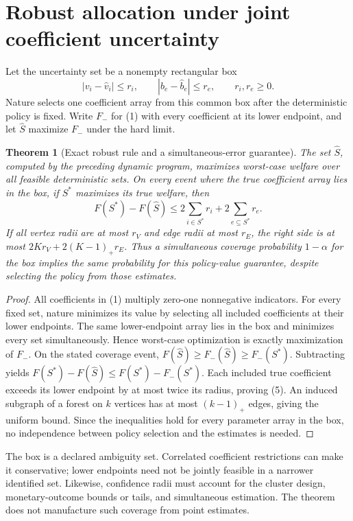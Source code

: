 \documentclass[11pt]{article}
\newtheorem{theorem}{Theorem}
\theoremstyle{remark}\newtheorem{remark}[theorem]{Remark}
\begin{document}
\section*{Robust allocation under joint coefficient uncertainty}
Let the uncertainty set be a nonempty rectangular box
\[
 |v_i-\widehat v_i|\le r_i,\qquad
 |b_e-\widehat b_e|\le r_e,\qquad r_i,r_e\ge0.
\]
Nature selects one coefficient array from this common box after the deterministic policy is fixed. Write $F_-$ for (1) with every coefficient at its lower endpoint, and let $\widehat S$ maximize $F_-$ under the hard limit.

\begin{theorem}[Exact robust rule and a simultaneous-error guarantee]
The set $\widehat S$, computed by the preceding dynamic program, maximizes worst-case welfare over all feasible deterministic sets. On every event where the true coefficient array lies in the box, if $S^*$ maximizes its true welfare, then
\[
 F(S^*)-F(\widehat S)
 \le 2\sum_{i\in S^*}r_i+
 2\sum_{e\subseteq S^*}r_e.
 \tag{5}
\]
If all vertex radii are at most $r_V$ and edge radii at most $r_E$, the right side is at most $2Kr_V+2(K-1)_+r_E$. Thus a simultaneous coverage probability $1-\alpha$ for the box implies the same probability for this policy-value guarantee, despite selecting the policy from those estimates.
\end{theorem}
\begin{proof}
All coefficients in (1) multiply zero-one nonnegative indicators. For every fixed set, nature minimizes its value by selecting all included coefficients at their lower endpoints. The same lower-endpoint array lies in the box and minimizes every set simultaneously. Hence worst-case optimization is exactly maximization of $F_-$. On the stated coverage event, $F(\widehat S)\ge F_-(\widehat S)\ge F_-(S^*)$. Subtracting yields $F(S^*)-F(\widehat S)\le F(S^*)-F_-(S^*)$. Each included true coefficient exceeds its lower endpoint by at most twice its radius, proving (5). An induced subgraph of a forest on $k$ vertices has at most $(k-1)_+$ edges, giving the uniform bound. Since the inequalities hold for every parameter array in the box, no independence between policy selection and the estimates is needed.
\end{proof}

The box is a declared ambiguity set. Correlated coefficient restrictions can make it conservative; lower endpoints need not be jointly feasible in a narrower identified set. Likewise, confidence radii must account for the cluster design, monetary-outcome bounds or tails, and simultaneous estimation. The theorem does not manufacture such coverage from point estimates.
\end{document}
